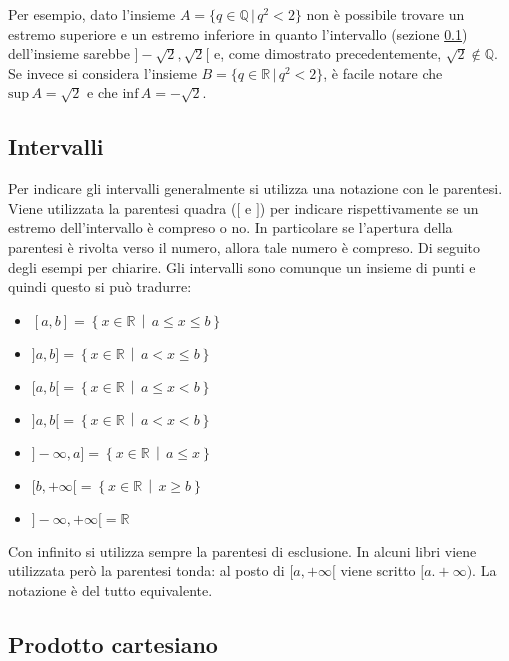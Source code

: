 Per esempio, dato l'insieme $A = \{q \in \mathbb{Q}\,|\,q^2 < 2\}$ non è possibile trovare un estremo superiore e un estremo inferiore in quanto l'intervallo (sezione \ref{sec_intervalli}) dell'insieme sarebbe $]-\sqrt{2}, \sqrt{2}[$ e, come dimostrato precedentemente, $\sqrt{2} \notin \mathbb{Q}$. Se invece si considera l'insieme $B = \{q \in \mathbb{R}\,|\,q^2 < 2\}$, è facile notare che $\mathrm{sup}\,A = \sqrt{2}$ e che $\mathrm{inf}\, A = -\sqrt{2}$.

\subsection{Intervalli} \label{sec_intervalli}
Per indicare gli intervalli generalmente si utilizza una notazione con le parentesi. Viene utilizzata la parentesi quadra ($[$ e $]$) per indicare rispettivamente se un estremo dell'intervallo è compreso o no. In particolare se l'apertura della parentesi è rivolta verso il numero, allora tale numero è compreso. Di seguito degli esempi per chiarire. Gli intervalli sono comunque un insieme di punti e quindi questo si può tradurre:
\begin{multicols}{2}
\begin{itemize}
    \item $[a, b] = \left\{ x \in \mathbb{R}\, \middle|\, a \leq x 	\leq b\right\}$
    \item $]a, b] = \left\{ x \in \mathbb{R}\, \middle|\, a < x \leq b\right\}$
    \item $[a, b[ = \left\{ x \in \mathbb{R}\, \middle|\, a \leq x < b\right\}$
    \item $]a, b[ = \left\{ x \in \mathbb{R}\, \middle|\, a < x < b\right\}$
    
    \item $]-\infty, a] = \left\{ x \in \mathbb{R}\, \middle|\, a \leq x \right\}$
    \item $[b, +\infty[ = \left\{ x \in \mathbb{R}\, \middle|\, x \geq b \right\}$
    \item $]-\infty, +\infty[ = \mathbb{R}$
\end{itemize}
\end{multicols}
Con infinito si utilizza sempre la parentesi di esclusione. In alcuni libri viene utilizzata però la parentesi tonda: al posto di $[a,+\infty[$ viene scritto $[a. +\infty)$. La notazione è del tutto equivalente.

\subsection{Prodotto cartesiano}

